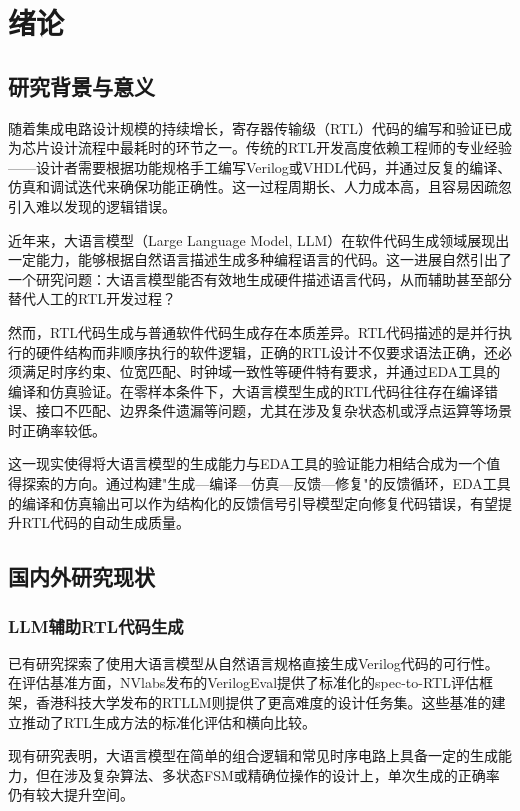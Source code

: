 \chapter{绪论}

\section{研究背景与意义}

随着集成电路设计规模的持续增长，寄存器传输级（RTL）代码的编写和验证已成为芯片设计流程中最耗时的环节之一。传统的RTL开发高度依赖工程师的专业经验——设计者需要根据功能规格手工编写Verilog或VHDL代码，并通过反复的编译、仿真和调试迭代来确保功能正确性。这一过程周期长、人力成本高，且容易因疏忽引入难以发现的逻辑错误。

近年来，大语言模型（Large Language Model, LLM）在软件代码生成领域展现出一定能力，能够根据自然语言描述生成多种编程语言的代码。这一进展自然引出了一个研究问题：大语言模型能否有效地生成硬件描述语言代码，从而辅助甚至部分替代人工的RTL开发过程？

然而，RTL代码生成与普通软件代码生成存在本质差异。RTL代码描述的是并行执行的硬件结构而非顺序执行的软件逻辑，正确的RTL设计不仅要求语法正确，还必须满足时序约束、位宽匹配、时钟域一致性等硬件特有要求，并通过EDA工具的编译和仿真验证。在零样本条件下，大语言模型生成的RTL代码往往存在编译错误、接口不匹配、边界条件遗漏等问题，尤其在涉及复杂状态机或浮点运算等场景时正确率较低。

这一现实使得将大语言模型的生成能力与EDA工具的验证能力相结合成为一个值得探索的方向。通过构建"生成—编译—仿真—反馈—修复"的反馈循环，EDA工具的编译和仿真输出可以作为结构化的反馈信号引导模型定向修复代码错误，有望提升RTL代码的自动生成质量。

\section{国内外研究现状}

\subsection{LLM辅助RTL代码生成}

已有研究探索了使用大语言模型从自然语言规格直接生成Verilog代码的可行性\cite{chipgpt,thakur2023verigen}。在评估基准方面，NVlabs发布的VerilogEval\cite{verilogeval}提供了标准化的spec-to-RTL评估框架，香港科技大学发布的RTLLM\cite{rtllm}则提供了更高难度的设计任务集。这些基准的建立推动了RTL生成方法的标准化评估和横向比较。

现有研究表明，大语言模型在简单的组合逻辑和常见时序电路上具备一定的生成能力，但在涉及复杂算法、多状态FSM或精确位操作的设计上，单次生成的正确率仍有较大提升空间。

